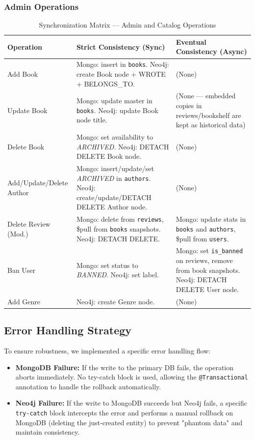 \subsubsection{Admin Operations}
\begin{table}[H]
    \centering
    \caption{Synchronization Matrix --- Admin and Catalog Operations}
    \label{tab:sync_matrix_admin}
    \renewcommand{\arraystretch}{1.4}
    \begin{tabular}{@{}p{}p{}p{}@{}}
        \toprule
        \textbf{Operation} & \textbf{Strict Consistency (Sync)} & \textbf{Eventual Consistency (Async)} \\ \midrule
        Add Book & Mongo: insert in \texttt{books}. Neo4j: create Book node + WROTE + BELONGS\_TO. & (None) \\
        Update Book & Mongo: update master in \texttt{books}. Neo4j: update Book node title. & (None --- embedded copies in reviews/bookshelf are kept as historical data) \\
        Delete Book & Mongo: set availability to \textit{ARCHIVED}. Neo4j: DETACH DELETE Book node. & (None) \\
        Add/Update/Delete Author & Mongo: insert/update/set \textit{ARCHIVED} in \texttt{authors}. Neo4j: create/update/DETACH DELETE Author node. & (None) \\
        Delete Review (Mod.) & Mongo: delete from \texttt{reviews}, \$pull from \texttt{books} snapshots. Neo4j: DETACH DELETE. & Mongo: update stats in \texttt{books} and \texttt{authors}, \$pull from \texttt{users}. \\
        Ban User & Mongo: set status to \textit{BANNED}. Neo4j: set label. & Mongo: set \texttt{is\_banned} on reviews, remove from book snapshots. Neo4j: DETACH DELETE User node. \\
        Add Genre & Neo4j: create Genre node. & (None) \\
        \bottomrule
    \end{tabular}
\end{table}

\subsection{Error Handling Strategy}
To ensure robustness, we implemented a specific error handling flow:
\begin{itemize}
    \item \textbf{MongoDB Failure:} If the write to the primary DB fails, the operation aborts immediately. No try-catch block is used, allowing the \texttt{@Transactional} annotation to handle the rollback automatically.
    \item \textbf{Neo4j Failure:} If the write to MongoDB succeeds but Neo4j fails, a specific \texttt{try-catch} block intercepts the error and performs a manual rollback on MongoDB (deleting the just-created entity) to prevent "phantom data" and maintain consistency.
\end{itemize}

